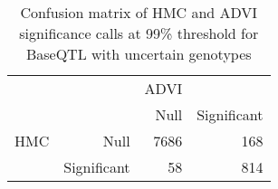 \begin{table}[ht]
\centering
\caption{Confusion matrix of HMC and ADVI significance calls at 99\% threshold for BaseQTL with uncertain genotypes} 
\label{tab:noGT-xtab-99}
\begin{tabular}{rr|rr}
   &  & ADVI &  \\ 
    &   & Null & Significant \\ 
   \hline
HMC & Null & 7686 & 168 \\ 
    & Significant & 58 & 814 \\ 
  \end{tabular}
\end{table}
